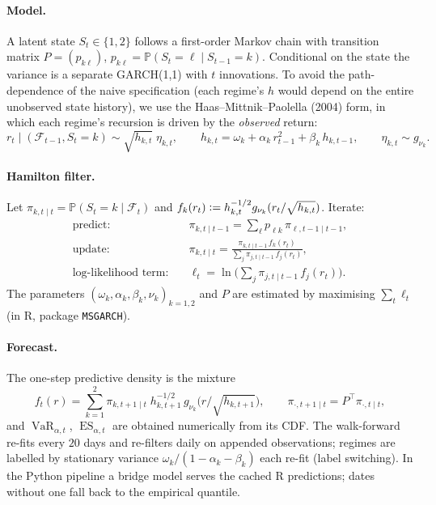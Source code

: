 \documentclass[11pt,a4paper]{article}
\newcommand{\Prob}{\mathbb{P}}
\newcommand{\VaR}{\operatorname{VaR}}
\newcommand{\ES}{\operatorname{ES}}
\newcommand{\Fcal}{\mathcal{F}}
\newcommand{\eqdef}{\mathrel{\vcentcolon=}}
\begin{document}
\paragraph{Model.} A latent state $S_t\in\{1,2\}$ follows a first-order Markov
chain with transition matrix $P=(p_{k\ell})$, $p_{k\ell}=\Prob(S_t=\ell\mid
S_{t-1}=k)$. Conditional on the state the variance is a separate GARCH(1,1) with
$t$ innovations. To avoid the path-dependence of the naive specification (each
regime's $h$ would depend on the entire unobserved state history), we use the
Haas--Mittnik--Paolella (2004) form, in which each regime's recursion is driven
by the \emph{observed} return:
\begin{equation}
  r_t \mid (\Fcal_{t-1},S_t=k) \sim \sqrt{h_{k,t}}\;\eta_{k,t},
  \qquad
  h_{k,t} = \omega_k + \alpha_k\,r_{t-1}^2 + \beta_k\,h_{k,t-1},
  \qquad
  \eta_{k,t}\sim g_{\nu_k}.
\end{equation}

\paragraph{Hamilton filter.} Let $\pi_{k,t\mid t}=\Prob(S_t=k\mid\Fcal_t)$ and
$f_k(r_t)\eqdef h_{k,t}^{-1/2} g_{\nu_k}(r_t/\sqrt{h_{k,t}})$. Iterate:
\begin{align}
  \text{predict:}\quad &
    \pi_{k,t\mid t-1} = \sum_{\ell} p_{\ell k}\,\pi_{\ell,t-1\mid t-1}, \\
  \text{update:}\quad &
    \pi_{k,t\mid t} = \frac{\pi_{k,t\mid t-1}\,f_k(r_t)}
                           {\sum_j \pi_{j,t\mid t-1}\,f_j(r_t)}, \\
  \text{log-likelihood term:}\quad &
    \ell_t = \ln\!\Big(\sum_j \pi_{j,t\mid t-1}\,f_j(r_t)\Big).
\end{align}
The parameters $(\omega_k,\alpha_k,\beta_k,\nu_k)_{k=1,2}$ and $P$ are estimated
by maximising $\sum_t \ell_t$ (in R, package \texttt{MSGARCH}).

\paragraph{Forecast.} The one-step predictive density is the mixture
\begin{equation}
  f_t(r) = \sum_{k=1}^{2}\pi_{k,t+1\mid t}\;
           h_{k,t+1}^{-1/2}\,g_{\nu_k}\!\big(r/\sqrt{h_{k,t+1}}\big),
  \qquad
  \pi_{\cdot,t+1\mid t} = P^{\top}\pi_{\cdot,t\mid t},
\end{equation}
and $\VaR_{\alpha,t}$, $\ES_{\alpha,t}$ are obtained numerically from its CDF.
The walk-forward re-fits every $20$ days and re-filters daily on appended
observations; regimes are labelled by stationary variance
$\omega_k/(1-\alpha_k-\beta_k)$ each re-fit (label switching). In the Python
pipeline a bridge model serves the cached R predictions; dates without one fall
back to the empirical quantile.
\end{document}
